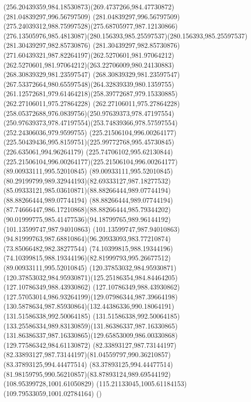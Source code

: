 {    \curveto(256.20439359,984.18530873)(269.4737266,984.47730872)(281.04839297,996.56797509)
    \curveto(281.04839297,996.56797509)(275.24039312,988.75997528)(275.68705977,987.12130866)
    \curveto(276.13505976,985.4813087)(280.156393,985.25597537)(280.156393,985.25597537)
    \lineto(281.30439297,982.85730876)
    \curveto(281.30439297,982.85730876)(271.60439321,987.82264197)(262.5270601,981.97064212)
    \curveto(262.5270601,981.97064212)(263.22706009,980.24130883)(268.30839329,981.23597547)
    \curveto(268.30839329,981.23597547)(267.53372664,980.65597548)(264.32839339,980.1359755)
    \curveto(261.12572681,979.61464218)(258.39772687,979.15330885)(262.27106011,975.27864228)
    \curveto(262.27106011,975.27864228)(258.05372688,976.0839756)(250.97639373,978.47197554)
    \curveto(250.97639373,978.47197554)(253.74839366,978.57597554)(252.24306036,979.9599755)
    \moveto(225.21506104,996.00264177)
    \curveto(225.50439436,995.8159751)(225.99772768,995.45730845)(226.635061,994.96264179)
    \curveto(225.74706102,995.62130844)(225.21506104,996.00264177)(225.21506104,996.00264177)
    \closepath
    \moveto(89.00933111,995.52010845)
    \curveto(89.00933111,995.52010845)(80.29199799,989.32944193)(82.69333127,987.18277532)
    \curveto(85.09333121,985.03610871)(88.88266444,989.07744194)(88.88266444,989.07744194)
    \curveto(88.88266444,989.07744194)(87.74666447,986.17210868)(88.88266444,985.79344202)
    \curveto(90.01999775,985.41477536)(94.18799765,989.96144192)(101.13599747,987.94010863)
    \curveto(101.13599747,987.94010863)(94.81999763,987.68810864)(96.20933093,983.77210874)
    \lineto(73.85066482,982.38277544)
    \lineto(74.10399815,988.19344196)
    \curveto(74.10399815,988.19344196)(82.81999793,995.26677512)(89.00933111,995.52010845)
    \closepath
    \moveto(120.37853032,984.95930871)
    \curveto(120.37853032,984.95930871)(125.25186354,984.84464205)(127.10786349,988.43930862)
    \curveto(127.10786349,988.43930862)(127.57053014,986.93264199)(129.07986344,987.39664198)
    \curveto(130.5878634,987.85930864)(132.44386336,990.18064191)(131.51586338,992.50064185)
    \curveto(131.51586338,992.50064185)(133.25586334,989.83130859)(131.86386337,987.16330865)
    \curveto(131.86386337,987.16330865)(129.65853009,986.00330868)(129.77586342,984.61130872)
    \closepath
    \moveto(82.33893127,987.73144197)
    \curveto(82.33893127,987.73144197)(81.04559797,990.36210857)(83.37893125,994.44477514)
    \curveto(83.37893125,994.44477514)(81.98159795,990.56210857)(83.87893124,989.69544192)
    \closepath
    \moveto(108.95399728,1001.61050829)
    \lineto(115.21133045,1005.61184153)
    \lineto(109.79533059,1001.02784164)
    \closepath
    \translate(\iftoggle{a4paper}{2,-75}{0,0})
}
